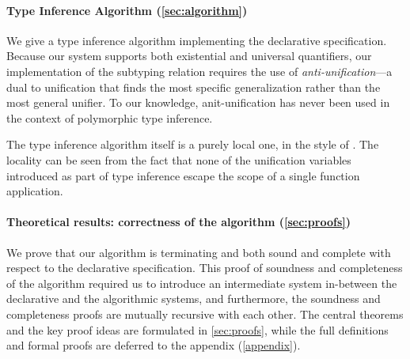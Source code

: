 \paragraph{Type Inference Algorithm (\cref{sec:algorithm})} We give a type
  inference algorithm implementing the declarative specification. Because our
  system supports both existential and universal quantifiers, our implementation
  of the subtyping relation requires the use of \emph{anti-unification}---a dual
  to unification that finds the most specific generalization rather than the
  most general unifier. To our knowledge, anit-unification has never been used
  in the context of polymorphic type inference.

  The type inference algorithm itself is a purely local one, in the style of
  \citet{pierce2000:local}. The locality can be seen from the fact that 
  none of the unification variables introduced as part of type inference
  escape the scope of a single function application.

\paragraph{Theoretical results: correctness of the algorithm (\cref{sec:proofs})}
  We prove that our algorithm is terminating and both sound and complete with
  respect to the declarative specification. This proof of soundness and completeness
  of the algorithm required us to introduce an intermediate system in-between
  the declarative and the algorithmic systems, and furthermore, the
  soundness and completeness proofs are mutually recursive with each other.
  The central theorems and the key proof ideas are formulated in \cref{sec:proofs}, 
  while the full definitions and formal proofs are deferred to the appendix (\cref{appendix}).

  

